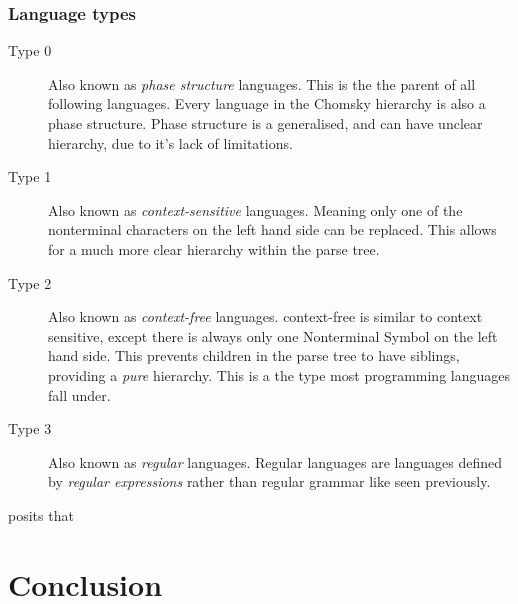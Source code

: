\subsubsection{Language types}
\begin{description}
    \item[Type 0] Also known as \textit{phase structure} languages. This is the the parent of all following languages. Every language in the Chomsky hierarchy is also a phase structure. Phase structure is a generalised, and can have unclear hierarchy, due to it's lack of limitations.
    \item[Type 1] Also known as \textit{context-sensitive} languages. Meaning only one of the nonterminal characters on the left hand side can be replaced. This allows for a much more clear hierarchy within the parse tree.
    \item[Type 2] Also known as \textit{context-free} languages. context-free is similar to context sensitive, except there is always only one Nonterminal Symbol on the left hand side. This prevents children in the parse tree to have siblings, providing a \textit{pure} hierarchy. This is a the type most programming languages fall under.
    \item[Type 3]  Also known as \textit{regular} languages. Regular languages are languages defined by \textit{regular expressions} rather than regular grammar like seen previously.
\end{description}

\autocite{ParseTech} posits that 



\newpage
\section{Conclusion}